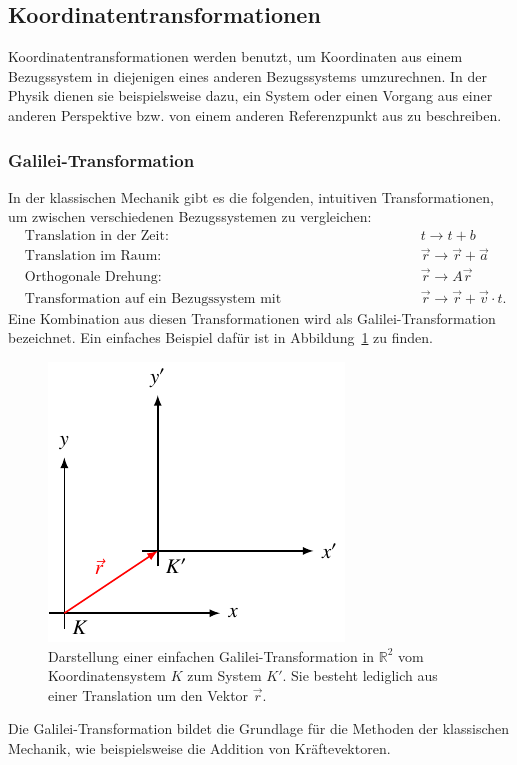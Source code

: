 \subsection{Koordinatentransformationen 
\label{relativ:section:koordtrafo}}

Koordinatentransformationen werden benutzt,
um Koordinaten aus einem Bezugssystem in diejenigen eines anderen Bezugssystems umzurechnen.
In der Physik dienen sie beispielsweise dazu,
ein System oder einen Vorgang aus einer anderen Perspektive bzw.
von einem anderen Referenzpunkt aus zu beschreiben.

\subsubsection{Galilei-Transformation 
\label{relativ:section:galilei-trafo}}

In der klassischen Mechanik gibt es die folgenden,
intuitiven Transformationen, um zwischen verschiedenen Bezugssystemen
zu vergleichen:
\[
\begin{aligned}
    &\text{Translation in der Zeit: } && t \rightarrow t + b \\
    &\text{Translation im Raum: } && \vec{r} \rightarrow \vec{r} + \vec{a} \\
    &\text{Orthogonale Drehung: } && \vec{r} \rightarrow A \vec{r} \\
    &\text{Transformation auf ein Bezugssystem mit Relativgeschwindigkeit: } && \vec{r} \rightarrow \vec{r} + \vec{v} \cdot t .
\end{aligned}
\]
Eine Kombination aus diesen Transformationen wird als Galilei-Transformation bezeichnet.
Ein einfaches Beispiel dafür ist in Abbildung~\ref{relativ:fig:galilei-trafo} zu finden.
\begin{figure}
    \centering
    \includegraphics{papers/relativ/tikz/galilei_trafo.pdf}
    \caption{Darstellung einer einfachen Galilei-Transformation in \(\mathbb{R}^2\)
    vom Koordinatensystem \(K\) zum System \(K'\).
    Sie besteht lediglich aus einer Translation um den Vektor \(\vec{r}\).
    \label{relativ:fig:galilei-trafo}}
\end{figure}
Die Galilei-Transformation bildet die Grundlage für die Methoden der klassischen Mechanik,
wie beispielsweise die Addition von Kräftevektoren.

